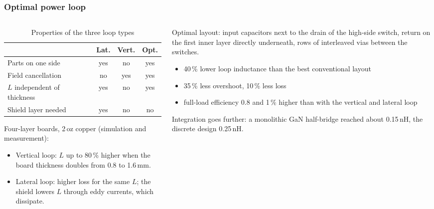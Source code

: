 \begin{frame}
	\frametitle{Optimal power loop}
	\begin{columns}[T]
		\begin{column}{0.5\textwidth}
			\begin{table}
				\centering
				\footnotesize
				\begin{tabular}{|l|c|c|c|}
					\hline
					                                & \textbf{Lat.} & \textbf{Vert.} & \textbf{Opt.} \\
					\hline
					Parts on one side               & yes           & no             & yes           \\
					Field cancellation              & no            & yes            & yes           \\
					$L$ independent of thickness    & yes           & no             & yes           \\
					Shield layer needed             & yes           & no             & no            \\
					\hline
				\end{tabular}
				\caption{Properties of the three loop types}
			\end{table}
			\footnotesize
			Four-layer boards, 2\,oz copper (simulation and measurement):
			\begin{itemize}
				\item Vertical loop: $L$ up to 80\,\% higher when the board thickness doubles from 0.8 to 1.6\,mm.
				\item Lateral loop: higher loss for the same $L$; the shield lowers $L$ through eddy currents, which dissipate.
			\end{itemize}
		\end{column}
		\begin{column}{0.46\textwidth}
			\footnotesize
			Optimal layout: input capacitors next to the drain of the high-side switch, return on the first inner layer directly underneath, rows of interleaved vias between the switches.
			\begin{itemize}
				\item 40\,\% lower loop inductance than the best conventional layout
				\item 35\,\% less overshoot, 10\,\% less loss
				\item full-load efficiency 0.8 and 1\,\% higher than with the vertical and lateral loop
			\end{itemize}
			Integration goes further: a monolithic GaN half-bridge reached about 0.15\,nH, the discrete design 0.25\,nH.
		\end{column}
	\end{columns}
\end{frame}

